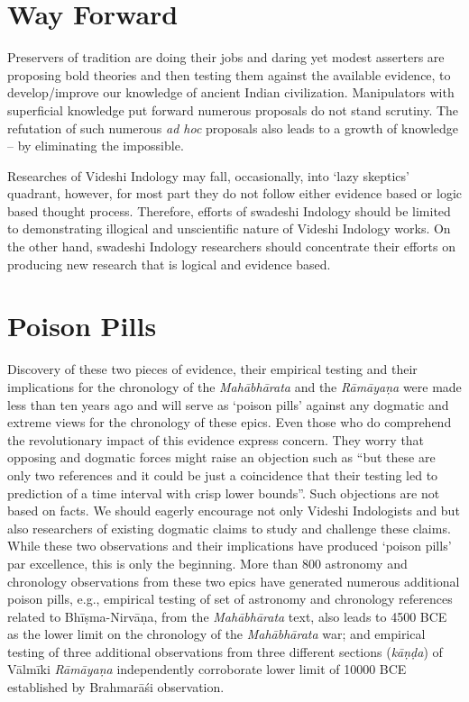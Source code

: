 \section*{Way Forward}

Preservers of tradition are doing their jobs and daring yet modest asserters are proposing bold theories and then testing them against the available evidence, to develop/improve our knowledge of ancient Indian civilization. Manipulators with superficial knowledge put forward numerous proposals do not stand scrutiny. The refutation of such numerous \textit{ad hoc} proposals also leads to a growth of knowledge – by eliminating the impossible.

Researches of Videshi Indology may fall, occasionally, into ‘lazy skeptics’ quadrant, however, for most part they do not follow either evidence based or logic based thought process. Therefore, efforts of swadeshi Indology should be limited to demonstrating illogical and unscientific nature of Videshi Indology works. On the other hand, swadeshi Indology researchers should concentrate their efforts on producing new research that is logical and evidence based.


\section*{Poison Pills}

Discovery of these two pieces of evidence, their empirical testing and their implications for the chronology of the \textit{Mahābhārata} and the \textit{Rāmāyaṇa} were made less than ten years ago and will serve as ‘poison pills’ against any dogmatic and extreme views for the chronology of these epics. Even those who do comprehend the revolutionary impact of this evidence express concern. They worry that opposing and dogmatic forces might raise an objection such as “but these are only two references and it could be just a coincidence that their testing led to prediction of a time interval with crisp lower bounds”. Such objections are not based on facts. We should eagerly encourage not only Videshi Indologists and but also researchers of existing dogmatic claims to study and challenge these claims. While these two observations and their implications have produced ‘poison pills’ par excellence, this is only the beginning. More than 800 astronomy and chronology observations from these two epics have generated numerous additional poison pills, e.g., empirical testing of set of astronomy and chronology references related to Bhīṣma-Nirvāṇa, from the \textit{Mahābhārata} text, also leads to 4500 BCE as the lower limit on the chronology of the \textit{Mahābhārata} war; and empirical testing of three additional observations from three different sections (\textit{kāṇḍa}) of Vālmīki \textit{Rāmāyaṇa} independently corroborate lower limit of 10000 BCE established by Brahmarāśi observation.

